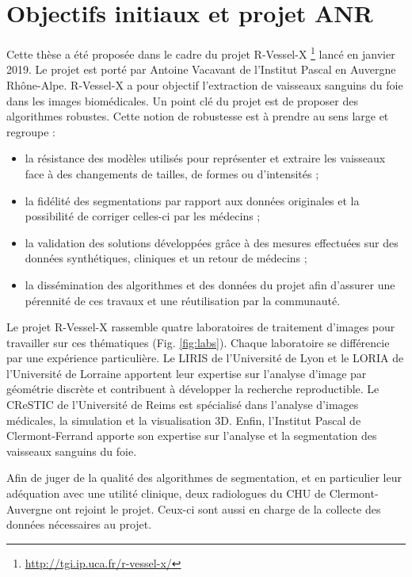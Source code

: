\section{Objectifs initiaux et projet ANR}
\label{sec:introduction:objectifs}

Cette thèse a été proposée dans le cadre du projet R-Vessel-X \footnote{\url{http://tgi.ip.uca.fr/r-vessel-x/}} lancé en janvier 2019. Le projet est porté par Antoine Vacavant de l'Institut Pascal en Auvergne Rhône-Alpe. R-Vessel-X a pour objectif l'extraction de vaisseaux sanguins du foie dans les images biomédicales. Un point clé du projet est de proposer des algorithmes robustes. Cette notion de robustesse est à prendre au sens large et regroupe :

\begin{itemize}
\item la résistance des modèles utilisés pour représenter et extraire les vaisseaux face à des changements de tailles, de formes ou d'intensités ;
\item la fidélité des segmentations par rapport aux données originales et la possibilité de corriger celles-ci par les médecins ;
\item la validation des solutions développées grâce à des mesures effectuées sur des données synthétiques, cliniques et un retour de médecins ;
\item la dissémination des algorithmes et des données du projet afin d'assurer une pérennité de ces travaux et une réutilisation par la communauté.
\end{itemize}

Le projet R-Vessel-X rassemble quatre laboratoires de traitement d'images pour travailler sur ces thématiques (Fig. \ref{fig:labs}). Chaque laboratoire se différencie par une expérience particulière. Le LIRIS de l'Université de Lyon et le LORIA de l'Université de Lorraine apportent leur expertise sur l'analyse d'image par géométrie discrète et contribuent à développer la recherche reproductible. Le CReSTIC de l'Université de Reims est spécialisé dans l'analyse d'images médicales, la simulation et la visualisation 3D. Enfin, l'Institut Pascal de Clermont-Ferrand apporte son expertise sur l'analyse et la segmentation des vaisseaux sanguins du foie.

Afin de juger de la qualité des algorithmes de segmentation, et en particulier leur adéquation avec une utilité clinique, deux radiologues du CHU de Clermont-Auvergne ont rejoint le projet. Ceux-ci sont aussi en charge de la collecte des données nécessaires au projet.

